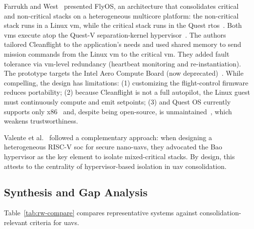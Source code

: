 Farrukh and West~\cite{farrukh_flyos_2023} presented FlyOS, an architecture
that consolidates critical and non-critical stacks on a heterogeneous multicore
platform: the non-critical stack runs in a Linux \gls{vm}, while the critical
stack runs in the Quest \gls{rtos}~\cite{danish_virtual-cpu_2011,questOS-home,questOS-repo}.
Both \glspl{vm} execute atop the Quest-V separation-kernel
hypervisor~\cite{li_quest-v_2013}. The authors tailored Cleanflight to the
application's needs and used shared memory to send mission commands from the
Linux \gls{vm} to the critical \gls{vm}. They added fault tolerance via
\gls{vm}-level redundancy (heartbeat monitoring and re-instantiation).
The prototype targets the Intel Aero Compute Board (now deprecated)~\cite{intel-aero}.
While compelling, the design has limitations: (1) customizing the flight-control
firmware reduces portability; (2) because Cleanflight is not a full autopilot, the Linux guest must continuously compute and emit
setpoints; (3) and Quest OS currently supports only x86~\cite{questOS-home}
and, despite being open-source, is unmaintained~\cite{questOS-repo}, which
weakens trustworthiness.

Valente et al.~\cite{valente_heterogeneous_2024} followed a complementary approach:
when designing a heterogeneous RISC-V \gls{soc} for secure nano-\glspl{uav}, they advocated the Bao hypervisor as the key element
to isolate mixed-critical stacks. By design, this attests to the centrality of
hypervisor-based isolation in \gls{uav} consolidation.

\subsection{Synthesis and Gap Analysis}
\label{subsec:rw-gap}
Table~\ref{tab:rw-compare} compares representative systems against
consolidation-relevant criteria for \glspl{uav}.

